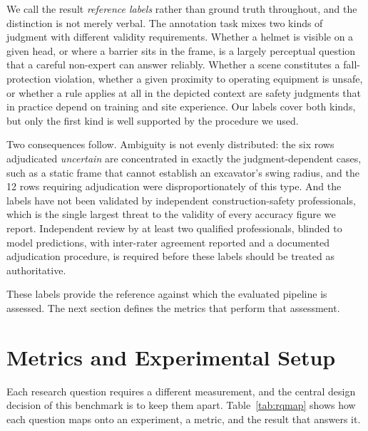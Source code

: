 \documentclass[conference]{IEEEtran}
\begin{document}
We call the result \textit{reference labels} rather than ground truth throughout, and the distinction is not merely verbal. The annotation task mixes two kinds of judgment with different validity requirements. Whether a helmet is visible on a given head, or where a barrier sits in the frame, is a largely perceptual question that a careful non-expert can answer reliably. Whether a scene constitutes a fall-protection violation, whether a given proximity to operating equipment is unsafe, or whether a rule applies at all in the depicted context are safety judgments that in practice depend on training and site experience. Our labels cover both kinds, but only the first kind is well supported by the procedure we used.

Two consequences follow. Ambiguity is not evenly distributed: the six rows adjudicated \textit{uncertain} are concentrated in exactly the judgment-dependent cases, such as a static frame that cannot establish an excavator's swing radius, and the 12 rows requiring adjudication were disproportionately of this type. And the labels have not been validated by independent construction-safety professionals, which is the single largest threat to the validity of every accuracy figure we report. Independent review by at least two qualified professionals, blinded to model predictions, with inter-rater agreement reported and a documented adjudication procedure, is required before these labels should be treated as authoritative.

These labels provide the reference against which the evaluated pipeline is assessed. The next section defines the metrics that perform that assessment.

\section{Metrics and Experimental Setup}

Each research question requires a different measurement, and the central design decision of this benchmark is to keep them apart. Table~\ref{tab:rqmap} shows how each question maps onto an experiment, a metric, and the result that answers it.
\end{document}

